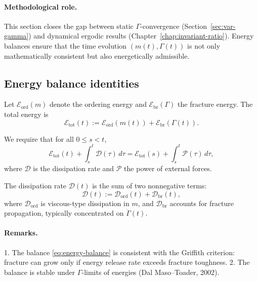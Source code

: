 \paragraph{Methodological role.}
This section closes the gap between static $\Gamma$-convergence (Section~\ref{sec:var-gamma}) 
and dynamical ergodic results (Chapter~\ref{chap:invariant-ratio}). 
Energy balances ensure that the time evolution $(m(t),\Gamma(t))$ is not only 
mathematically consistent but also energetically admissible.

\subsection{Energy balance identities}
Let $\mathcal{E}_{\mathrm{ord}}(m)$ denote the ordering energy and 
$\mathcal{E}_{\mathrm{br}}(\Gamma)$ the fracture energy. 
The total energy is
\[
  \mathcal{E}_{\mathrm{tot}}(t) := \mathcal{E}_{\mathrm{ord}}(m(t)) + \mathcal{E}_{\mathrm{br}}(\Gamma(t)).
\]

We require that for all $0\le s<t$,
\begin{equation}\label{eq:energy-balance}
  \mathcal{E}_{\mathrm{tot}}(t) + \int_s^t \mathcal{D}(\tau)\,d\tau
   = \mathcal{E}_{\mathrm{tot}}(s) + \int_s^t \mathcal{P}(\tau)\,d\tau,
\end{equation}
where $\mathcal{D}$ is the dissipation rate and $\mathcal{P}$ the power of external forces.

\begin{definition}
The dissipation rate $\mathcal{D}(t)$ is the sum of two nonnegative terms:
\[
  \mathcal{D}(t) := \mathcal{D}_{\mathrm{ord}}(t) + \mathcal{D}_{\mathrm{br}}(t),
\]
where $\mathcal{D}_{\mathrm{ord}}$ is viscous-type dissipation in $m$, 
and $\mathcal{D}_{\mathrm{br}}$ accounts for fracture propagation, typically concentrated on $\dot\Gamma(t)$.
\end{definition}

\paragraph{Remarks.}
1. The balance \eqref{eq:energy-balance} is consistent with the Griffith criterion: 
fracture can grow only if energy release rate exceeds fracture toughness.  
2. The balance is stable under $\Gamma$-limits of energies (Dal Maso--Toader, 2002).

